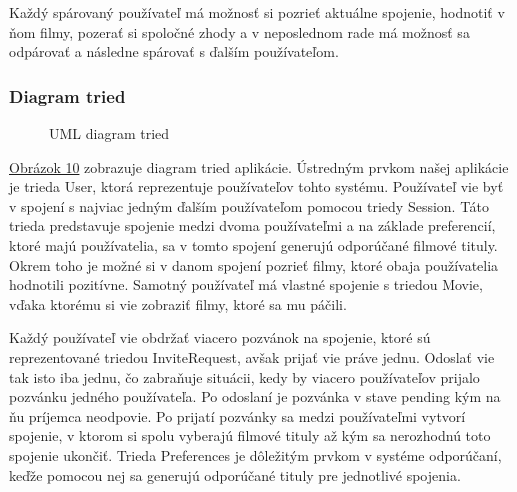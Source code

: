 Každý spárovaný používateľ má možnosť si pozrieť aktuálne spojenie, hodnotiť v ňom filmy, pozerať si spoločné zhody a v neposlednom rade má možnosť sa odpárovať a následne spárovať s ďalším používateľom. 

\subsubsection{Diagram tried}
\begin{figure}[hbt!]
  \centering  
  \def\stackalignment{c}
           {\scriptsize}
	\caption{UML diagram tried}  
  \label{classdiagram}
\end{figure}
\hyperref[classdiagram]{Obrázok 10} zobrazuje diagram tried aplikácie. Ústredným prvkom našej aplikácie je trieda User, ktorá reprezentuje používateľov tohto systému. Používateľ vie byť v spojení s najviac jedným ďalším používateľom pomocou triedy Session. Táto trieda predstavuje spojenie medzi dvoma používateľmi a na základe preferencií, ktoré majú používatelia, sa v tomto spojení generujú odporúčané filmové tituly. Okrem toho je možné si v danom spojení pozrieť filmy, ktoré obaja používatelia hodnotili pozitívne. Samotný používateľ má vlastné spojenie s triedou Movie, vďaka ktorému si vie zobraziť filmy, ktoré sa mu páčili.

Každý používateľ vie obdržať viacero pozvánok na spojenie, ktoré sú reprezentované triedou InviteRequest, avšak prijať vie práve jednu. Odoslať vie tak isto iba jednu, čo zabraňuje situácii, kedy by viacero používateľov prijalo pozvánku jedného používateľa. Po odoslaní je pozvánka v stave pending kým na ňu príjemca neodpovie. Po prijatí pozvánky sa medzi používateľmi vytvorí spojenie, v ktorom si spolu vyberajú filmové tituly až kým sa nerozhodnú toto spojenie ukončiť. Trieda Preferences je dôležitým prvkom v systéme odporúčaní, keďže pomocou nej sa generujú odporúčané tituly pre jednotlivé spojenia.

